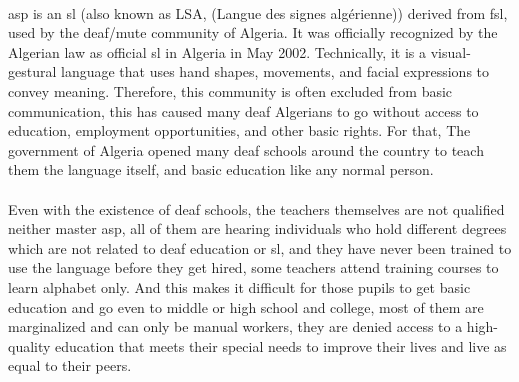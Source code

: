 \paragraph{}
\ac{asp} is an \ac{sl} (also known as LSA, (Langue des signes algérienne)) derived from \ac{fsl}, used by the deaf/mute community of Algeria. It was officially recognized by the Algerian law as official \ac{sl} in Algeria in May 2002\cite{wiki}. Technically, it is a visual-gestural language that uses hand shapes, movements, and facial expressions to convey meaning. Therefore, this community is often excluded from basic communication, this has caused many deaf Algerians to go without access to education, employment opportunities, and other basic rights. For that, The government of Algeria opened many deaf schools around the country to teach them the language itself, and basic education like any normal person.
\paragraph{}
Even with the existence of deaf schools, the teachers themselves are not qualified neither master \ac{asp}, all of them are hearing individuals who hold different degrees which are not related to deaf education or \ac{sl}, and they have never been trained to use the language before they get hired, some teachers attend training courses to learn alphabet only. And this makes it difficult for those pupils to get basic education and go even to middle or high school and college, most of them are marginalized and can only be manual workers, they are denied access to a high-quality education that meets their special needs to improve their lives and live as equal to their peers.\cite{chalenges}